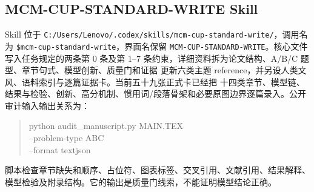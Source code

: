 \subsection{MCM-CUP-STANDARD-WRITE Skill}

Skill 位于
\texttt{C:/Users/Lenovo/.codex/skills/mcm-cup-standard-write/}，调用名为
\texttt{\$mcm-cup-standard-write}，界面名保留
\texttt{MCM-CUP-STANDARD-WRITE}。核心文件写入任务规定的两条第 0 条及第 1--7
条约束，详细资料拆为论文结构、A/B/C 题型、章节句式、模型创新、质量门和证据
更新六类主题 reference，并另设人类文风、语料索引与逐篇证据卡。当前五十九张正式卡已经把
十四类章节、模型链、结果与检验、创新、高分机制、惯用词/段落骨架和必要原图边界逐篇录入。公开审计输入输出关系为：
\begin{quote}
\small\ttfamily
python audit\_manuscript.py MAIN.TEX\\
\hspace*{1em}--problem-type A\textbar B\textbar C\\
\hspace*{1em}--format text\textbar json
\end{quote}
脚本检查章节缺失和顺序、占位符、图表标签、交叉引用、文献引用、结果解释、
模型检验及附录结构。它的输出是质量门线索，不能证明模型结论正确。

